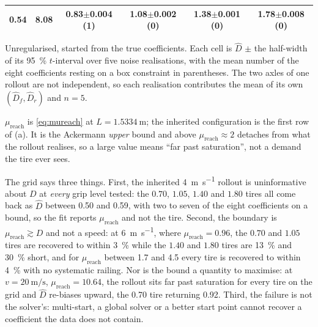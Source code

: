 \begin{table}[t]
\begin{threeparttable}
\begin{tabular}{@{}rrcccc@{}}
0.54 & 8.08 & \num{0.83}$\pm$\num{0.004} (1) & \num{1.08}$\pm$\num{0.002} (0) & \num{1.38}$\pm$\num{0.001} (0) & \num{1.78}$\pm$\num{0.008} (0)\\
\bottomrule
\end{tabular}
\begin{tablenotes}[flushleft]\scriptsize
\item Unregularised, started from the true coefficients. Each cell is $\hat D$ $\pm$ the half-width of its \SI{95}{\percent} $t$-interval over five noise realisations, with the mean number of the eight coefficients resting on a box constraint in parentheses. The two axles of one rollout are not independent, so each realisation contributes the mean of its own $(\hat D_{f},\hat D_{r})$ and $n=5$.
\item $\mu_{\mathrm{reach}}$ is \eqref{eq:mureach} at $L=\SI{1.5334}{\meter}$; the inherited configuration is the first row of (a). It is the Ackermann \emph{upper} bound and above $\mu_{\mathrm{reach}}\approx2$ detaches from what the rollout realises, so a large value means ``far past saturation'', not a demand the tire ever sees.
\end{tablenotes}
\end{threeparttable}
\end{table}

The grid says three things. First, the inherited \SI{4}{\meter\per\second}
rollout is uninformative about $D$ at \emph{every} grip level tested: the
$0.70$, $1.05$, $1.40$ and $1.80$ tires all come back as $\hat D$ between
\num{0.50} and \num{0.59}, with two to seven of the eight coefficients on a
bound, so the fit reports $\mu_{\mathrm{reach}}$ and not the tire. Second, the
boundary is $\mu_{\mathrm{reach}}\gtrsim D$ and not a speed: at
\SI{6}{\meter\per\second}, where $\mu_{\mathrm{reach}}=0.96$, the $0.70$ and
$1.05$ tires are recovered to within \SI{3}{\percent} while the $1.40$ and
$1.80$ tires are \SI{13}{\percent} and \SI{30}{\percent} short, and for
$\mu_{\mathrm{reach}}$ between \num{1.7} and \num{4.5} every tire is recovered
to within \SI{4}{\percent} with no systematic railing. Nor is the bound a
quantity to maximise: at $v=\SI{20}{\meter\per\second}$,
$\mu_{\mathrm{reach}}=\num{10.64}$, the rollout sits far past saturation for
every tire on the grid and $\hat D$ re-biases upward, the \num{0.70} tire
returning \num{0.92}. Third, the failure is not the solver's: multi-start, a
global solver or a better start point cannot recover a coefficient the data
does not contain.

